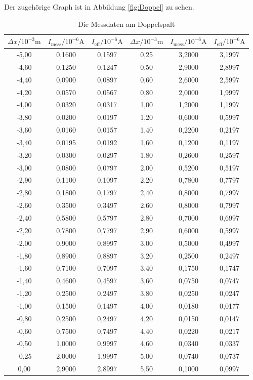 Der zugehörige Graph ist in Abbildung \ref{fig:Doppel} zu sehen.
\begin{table}[H]
    \centering
    \caption{Die Messdaten am Doppelspalt}
    \label{tab:2}
	\begin{tabular}{| c | c |c||c|c|c| }
		\toprule
		{$\Delta x/10^{-3}\si{\metre}$} & {$I_{\text{mess}}/10^{-6}\si{\ampere}$} & {$I_{\text{eff}}/10^{-6}\si{\ampere}$} & {$\Delta x/10^{-3}\si{\metre}$} & {$I_{\text{mess}}/10^{-6}\si{\ampere}$} & {$I_{\text{eff}}/10^{-6}\si{\ampere}$}\\
		\midrule
		
-5,00	&0,1600	&0,1597	&0,25	&3,2000	&3,1997\\
-4,60	&0,1250	&0,1247	&0,50	&2,9000	&2,8997\\
-4,40	&0,0900	&0,0897	&0,60	&2,6000	&2,5997\\
-4,20	&0,0570	&0,0567	&0,80	&2,0000	&1,9997\\
-4,00	&0,0320	&0,0317	&1,00	&1,2000	&1,1997\\
-3,80	&0,0200	&0,0197	&1,20	&0,6000	&0,5997\\
-3,60	&0,0160	&0,0157	&1,40	&0,2200	&0,2197\\
-3,40	&0,0195	&0,0192	&1,60	&0,1200	&0,1197\\
-3,20	&0,0300	&0,0297	&1,80	&0,2600	&0,2597\\
-3,00	&0,0800	&0,0797	&2,00	&0,5200	&0,5197\\
-2,90	&0,1100	&0,1097	&2,20	&0,7800	&0,7797\\
-2,80	&0,1800	&0,1797	&2,40	&0,8000	&0,7997\\
-2,60	&0,3500	&0,3497	&2,60	&0,8000	&0,7997\\
-2,40	&0,5800	&0,5797	&2,80	&0,7000	&0,6997\\
-2,20	&0,7800	&0,7797	&2,90	&0,6000	&0,5997\\
-2,00	&0,9000	&0,8997	&3,00	&0,5000	&0,4997\\
-1,80	&0,8900	&0,8897	&3,20	&0,2500	&0,2497\\
-1,60	&0,7100	&0,7097	&3,40	&0,1750	&0,1747\\
-1,40	&0,4600	&0,4597	&3,60	&0,0750	&0,0747\\
-1,20	&0,2500	&0,2497	&3,80	&0,0250	&0,0247\\
-1,00	&0,1500	&0,1497	&4,00	&0,0180	&0,0177\\
-0,80	&0,2500	&0,2497	&4,20	&0,0150	&0,0147\\
-0,60	&0,7500	&0,7497	&4,40	&0,0220	&0,0217\\
-0,50	&1,0000	&0,9997	&4,60	&0,0340	&0,0337\\
-0,25	&2,0000	&1,9997	&5,00	&0,0740	&0,0737\\
 0,00	&2,9000	&2,8997	&5,50	&0,1000	&0,0997\\

		\bottomrule
	\end{tabular}

	  \end{table}
	  \noindent




